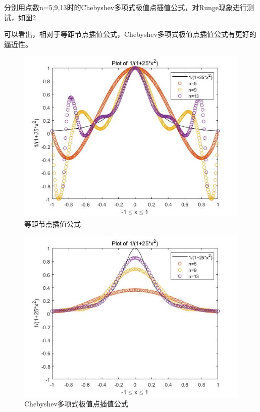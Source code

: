 \documentclass{article}%
\begin{document}
分别用点数n=5,9,13时的Chebyshev多项式极值点插值公式，对Runge现象进行测试，如图\ref{Fig:3}

可以看出，相对于等距节点插值公式，Chebyshev多项式极值点插值公式有更好的逼近性。\\

\begin{figure}[H]
	\begin{center}
		\includegraphics[width=1\linewidth]{week2.3.1.jpg}
		\caption{等距节点插值公式}
		\label{Fig:2}
	\end{center}
	\vspace{-0.5em}
\end{figure}

\begin{figure}[H]
	\begin{center}
		\includegraphics[width=1\linewidth]{week2.3.2.jpg}
		\caption{Chebyshev多项式极值点插值公式}
		\label{Fig:3}
	\end{center}
	\vspace{-0.5em}
\end{figure}
\end{document}
